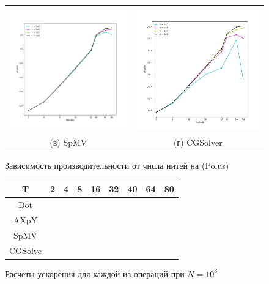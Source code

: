 \documentclass[12pt, a4paper]{article}
\begin{document}
\begin{figure}[H]
\begin{tabular}{cc}
		\includegraphics[width=85mm]{multithread_polus_spmv} & \includegraphics[width=85mm]{multithread_polus_cgsolver} \\
		(в) SpMV & (г) CGSolver \\[6pt]
	\end{tabular}
	\caption{Зависимость производительности от числа нитей на (Polus)}
	\label{fig:multithread_flops_polus} 
\end{figure}

\begin{figure}[H]
	\center
	\setlength{\tabcolsep}{10pt}
	\renewcommand{\arraystretch}{1.5}
	\begin{tabular}{|c|c|c|c|c|c|c|c|c|}
		\hline
		T & 2 & 4 & 8 & 16 & 32 & 40 & 64 & 80  \\
		\hline
		Dot &  &  &  &  &  &  &  &   \\
		\hline
		AXpY &  &  &  &  &  &  &  &   \\
		\hline
		SpMV &  &  &  &  &  &  &  &   \\
		\hline
		CGSolve &  &  &  &  &  &  &  &   \\
		\hline
	\end{tabular}
	\caption{Расчеты ускорения для каждой из операций при $N = 10^8$}
	\label{fig:speedup}
\end{figure}
\end{document}
